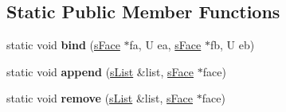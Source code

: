\subsection*{Static Public Member Functions}
\begin{DoxyCompactItemize}
\item 
\hypertarget{structgjkepa2__impl_1_1_e_p_a_ad9740a2ff2bd6d01b3bc4440c0391665}{static void {\bfseries bind} (\hyperlink{structgjkepa2__impl_1_1_e_p_a_1_1s_face}{s\+Face} $\ast$fa, U ea, \hyperlink{structgjkepa2__impl_1_1_e_p_a_1_1s_face}{s\+Face} $\ast$fb, U eb)}\label{structgjkepa2__impl_1_1_e_p_a_ad9740a2ff2bd6d01b3bc4440c0391665}

\item 
\hypertarget{structgjkepa2__impl_1_1_e_p_a_ab2183a53cd62b6227b2294e7864a7c5d}{static void {\bfseries append} (\hyperlink{structgjkepa2__impl_1_1_e_p_a_1_1s_list}{s\+List} \&list, \hyperlink{structgjkepa2__impl_1_1_e_p_a_1_1s_face}{s\+Face} $\ast$face)}\label{structgjkepa2__impl_1_1_e_p_a_ab2183a53cd62b6227b2294e7864a7c5d}

\item 
\hypertarget{structgjkepa2__impl_1_1_e_p_a_a2cc3a589df31713fcd2f8fb3a30b429a}{static void {\bfseries remove} (\hyperlink{structgjkepa2__impl_1_1_e_p_a_1_1s_list}{s\+List} \&list, \hyperlink{structgjkepa2__impl_1_1_e_p_a_1_1s_face}{s\+Face} $\ast$face)}\label{structgjkepa2__impl_1_1_e_p_a_a2cc3a589df31713fcd2f8fb3a30b429a}

\end{DoxyCompactItemize}
